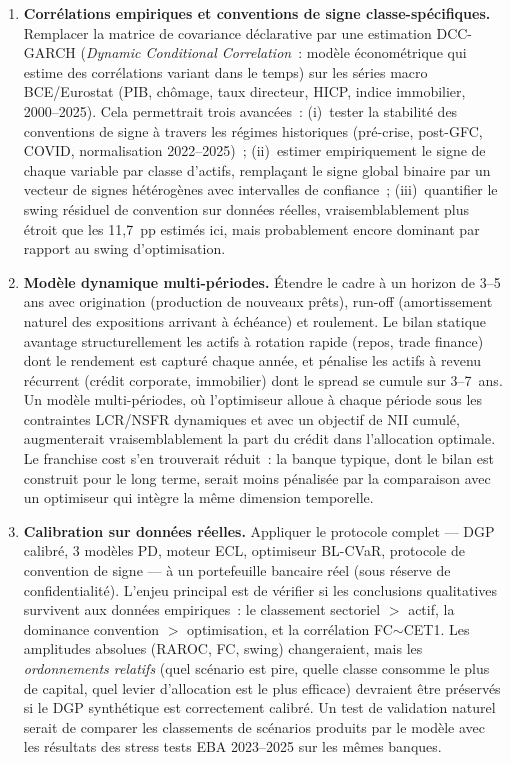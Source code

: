 \documentclass[10pt, a4paper, oneside]{report}
\theoremstyle{definition}
\begin{document}
\begin{enumerate}
\item \textbf{Corrélations empiriques et conventions de signe classe-spécifiques.} Remplacer la matrice de covariance déclarative par une estimation DCC-GARCH (\emph{Dynamic Conditional Correlation}~: modèle économétrique qui estime des corrélations variant dans le temps) \citep{engle2002} sur les séries macro BCE/Eurostat (PIB, chômage, taux directeur, HICP, indice immobilier, 2000--2025). Cela permettrait trois avancées~: (i)~tester la stabilité des conventions de signe à travers les régimes historiques (pré-crise, post-GFC, COVID, normalisation 2022--2025)~; (ii)~estimer empiriquement le signe de chaque variable par classe d'actifs, remplaçant le signe global binaire par un vecteur de signes hétérogènes avec intervalles de confiance~; (iii)~quantifier le swing résiduel de convention sur données réelles, vraisemblablement plus étroit que les 11{,}7~pp estimés ici, mais probablement encore dominant par rapport au swing d'optimisation.

\item \textbf{Modèle dynamique multi-périodes.} Étendre le cadre à un horizon de 3--5 ans avec origination (production de nouveaux prêts), run-off (amortissement naturel des expositions arrivant à échéance) et roulement. Le bilan statique avantage structurellement les actifs à rotation rapide (repos, trade finance) dont le rendement est capturé chaque année, et pénalise les actifs à revenu récurrent (crédit corporate, immobilier) dont le spread se cumule sur 3--7~ans. Un modèle multi-périodes, où l'optimiseur alloue à chaque période sous les contraintes LCR/NSFR dynamiques et avec un objectif de NII cumulé, augmenterait vraisemblablement la part du crédit dans l'allocation optimale. Le franchise cost s'en trouverait réduit~: la banque typique, dont le bilan est construit pour le long terme, serait moins pénalisée par la comparaison avec un optimiseur qui intègre la même dimension temporelle.

\item \textbf{Calibration sur données réelles.} Appliquer le protocole complet --- DGP calibré, 3 modèles PD, moteur ECL, optimiseur BL-CVaR, protocole de convention de signe --- à un portefeuille bancaire réel (sous réserve de confidentialité). L'enjeu principal est de vérifier si les conclusions qualitatives survivent aux données empiriques~: le classement sectoriel $>$ actif, la dominance convention $>$ optimisation, et la corrélation FC$\sim$CET1. Les amplitudes absolues (RAROC, FC, swing) changeraient, mais les \emph{ordonnements relatifs} (quel scénario est pire, quelle classe consomme le plus de capital, quel levier d'allocation est le plus efficace) devraient être préservés si le DGP synthétique est correctement calibré. Un test de validation naturel serait de comparer les classements de scénarios produits par le modèle avec les résultats des stress tests EBA 2023--2025 sur les mêmes banques.
\end{enumerate}
\end{document}
